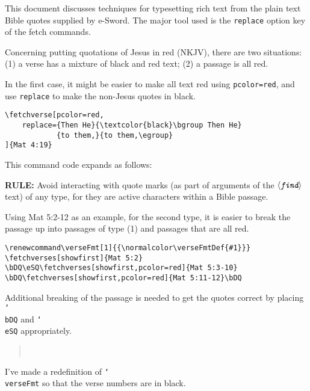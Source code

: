 \documentclass{article}
\providecommand\cs[1]{\texttt{\char`\\#1}}
\def\ameta#1{$\langle\textit{\texttt{#1}}\rangle$}
\begin{document}
\noindent This document discusses techniques for typesetting rich text from the plain text Bible quotes
supplied by \textsf{e-Sword}. The major tool used is the \texttt{replace} option key of the fetch commands.

Concerning putting quotations of Jesus in red (NKJV), there are two
situations: (1) a verse has a mixture of black and red text; (2) a passage is
all red.

In the first case, it might be easier to make all text red using \texttt{pcolor=red}, and use
\texttt{replace} to make the non-Jesus quotes in black.
\begin{Verbatim}[xleftmargin=\leftmargini,fontsize=\small]
\fetchverse[pcolor=red,
    replace={Then He}{\textcolor{black}\bgroup Then He}
            {to them,}{to them,\egroup}
]{Mat 4:19}
\end{Verbatim}
This command code expands as follows:
\begin{quote}
\end{quote}
\textbf{RULE:} Avoid interacting with quote marks (as part of arguments
of the \ameta{find} text) of any type, for they are active characters within
a Bible passage.

\medskip\noindent
Using \textsf{Mat 5:2-12} as an example, for the second type, it is easier to break
the passage up into passages of type (1) and passages that are all red.
\begin{Verbatim}[xleftmargin=\leftmargini,fontsize=\small]
\renewcommand\verseFmt[1]{{\normalcolor\verseFmtDef{#1}}}
\fetchverses[showfirst]{Mat 5:2}
\bDQ\eSQ\fetchverses[showfirst,pcolor=red]{Mat 5:3-10}
\bDQ\fetchverses[showfirst,pcolor=red]{Mat 5:11-12}\bDQ
\end{Verbatim}
Additional breaking of the passage is needed to get the quotes correct by
placing \cs{bDQ} and \cs{eSQ} appropriately.
\begin{quote} %
\renewcommand\verseFmt[1]{{\normalcolor\verseFmtDef{#1}}}%
\\[3pt]
\bDQ\eSQ{}
\bDQ{}\bDQ
\end{quote}
I've made a redefinition of \cs{verseFmt} so that the verse numbers
are in black.

\newpage
\end{document}
